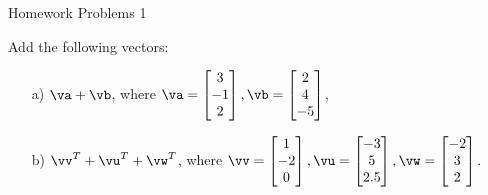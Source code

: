  \begin{center}\begin{large} Homework Problems 1 \end{large}\end{center}
 \bigskip


% 


\begin{problem}%
    Add the following vectors:

    \begin{enumerate}
        \item[a) ] $\va+\vb$, where $\va= \begin{bmatrix} 3 \\ -1 \\ 2 \end{bmatrix}, \vb=\begin{bmatrix} 2 \\ 4 \\ -5 \end{bmatrix}$,
        
        \item[b) ] $\vv^T+\vu^T+\vw^T$, where $\vv= \begin{bmatrix} 1 \\ -2 \\ 0 \end{bmatrix}, \vu = \begin{bmatrix} -3 \\ 5 \\ 2.5 \end{bmatrix}, \vw= \begin{bmatrix} -2 \\ 3 \\ 2 \end{bmatrix}$. 
    \end{enumerate}
\end{problem}

